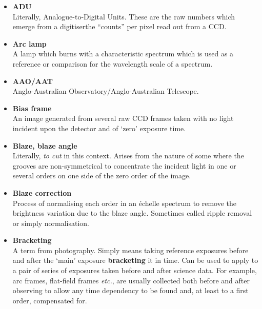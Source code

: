 \begin{itemize}

\item {\bf\label{gl_adu}ADU}\\
      Literally, Analogue-to-Digital Units.  These are the raw numbers
      which emerge from a digitiser\sgspec{---}{ - }the ``counts'' per pixel
      read out from a CCD.

\item {\bf\label{gl_arc_lamp}Arc lamp}\\
      A lamp which burns with a characteristic spectrum which is used as
      a reference or comparison for the wavelength scale of a spectrum.

\item {\bf\label{gl_aao_aat}AAO/AAT}\\
      Anglo-Australian Observatory/Anglo-Australian Telescope.

\item {\bf\label{gl_bias_frame}Bias frame}\\
      An image generated from several raw CCD frames taken with no
      light incident upon the detector and of `zero' exposure time.

\item {\bf\label{gl_blaze}Blaze, blaze angle}\\
      Literally, {\sl to cut\/} in this context.  Arises from the nature
      of some  where the grooves are
      non-symmetrical to
      concentrate the incident light in one or several orders on one
      side of the zero order of the image.

\item {\bf\label{gl_blaze_correction}Blaze correction}\\
      Process of normalising each order in an \'{e}chelle spectrum
      to remove the brightness variation due to the blaze angle.
      Sometimes called ripple removal or simply normalisation.

\item {\bf\label{gl_bracketing}Bracketing}\\
      A term from photography.  Simply means taking reference exposures
      before and after the `main' exposure {\bf bracketing} it in time.
      Can be used to apply to a pair of series of exposures taken before
      and after science data.  For example, arc frames, flat-field frames
      {\em etc.}, are usually collected both before and after observing to
      allow any time dependency to be found and, at least to a first order,
      compensated for.


\end{itemize}
